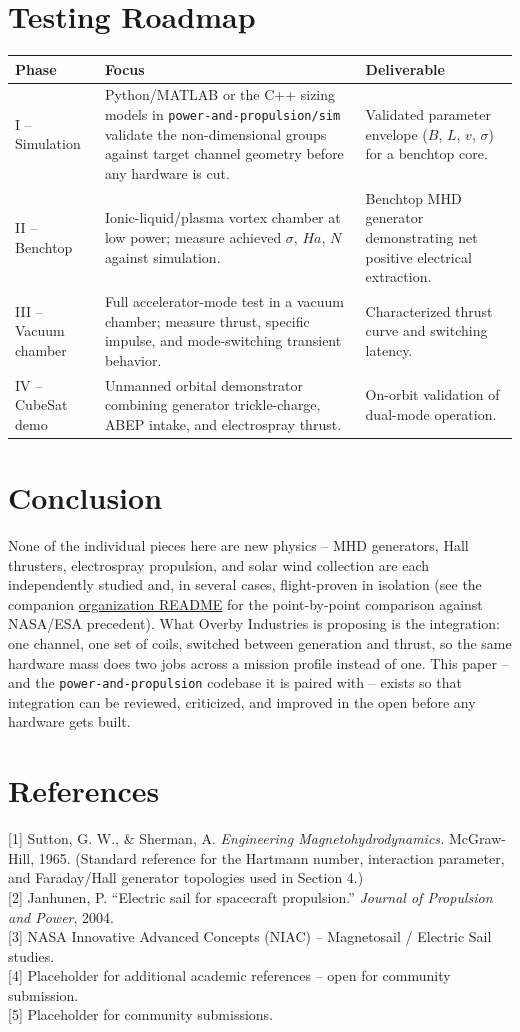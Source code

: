 \documentclass[12pt]{article}
\begin{document}
\section{Testing Roadmap}
\begin{longtable}{p{2.6cm} p{4.8cm} p{6.2cm}}
\textbf{Phase} & \textbf{Focus} & \textbf{Deliverable} \\
\hline
\endhead
I -- Simulation & Python/MATLAB or the C++ sizing models in \texttt{power-and-propulsion/sim} validate the non-dimensional groups against target channel geometry before any hardware is cut. & Validated parameter envelope ($B$, $L$, $v$, $\sigma$) for a benchtop core. \\
II -- Benchtop & Ionic-liquid/plasma vortex chamber at low power; measure achieved $\sigma$, $Ha$, $N$ against simulation. & Benchtop MHD generator demonstrating net positive electrical extraction. \\
III -- Vacuum chamber & Full accelerator-mode test in a vacuum chamber; measure thrust, specific impulse, and mode-switching transient behavior. & Characterized thrust curve and switching latency. \\
IV -- CubeSat demo & Unmanned orbital demonstrator combining generator trickle-charge, ABEP intake, and electrospray thrust. & On-orbit validation of dual-mode operation. \\
\end{longtable}

\section{Conclusion}
None of the individual pieces here are new physics -- MHD generators, Hall thrusters, electrospray propulsion, and solar wind collection are each independently studied and, in several cases, flight-proven in isolation (see the companion \href{https://github.com/Overby-Industries}{organization README} for the point-by-point comparison against NASA/ESA precedent). What Overby Industries is proposing is the integration: one channel, one set of coils, switched between generation and thrust, so the same hardware mass does two jobs across a mission profile instead of one. This paper -- and the \texttt{power-and-propulsion} codebase it is paired with -- exists so that integration can be reviewed, criticized, and improved in the open before any hardware gets built.

\section{References}
[1] Sutton, G. W., \& Sherman, A. \textit{Engineering Magnetohydrodynamics.} McGraw-Hill, 1965. (Standard reference for the Hartmann number, interaction parameter, and Faraday/Hall generator topologies used in Section 4.)\\{}
[2] Janhunen, P. ``Electric sail for spacecraft propulsion.'' \textit{Journal of Propulsion and Power}, 2004.\\{}
[3] NASA Innovative Advanced Concepts (NIAC) -- Magnetosail / Electric Sail studies.\\{}
[4] Placeholder for additional academic references -- open for community submission.\\{}
[5] Placeholder for community submissions.
\end{document}
